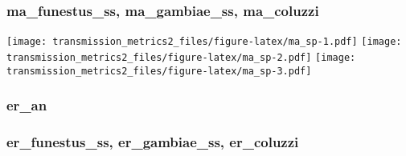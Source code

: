 \documentclass[]{article}
\begin{document}
\hypertarget{ma_funestus_ss-ma_gambiae_ss-ma_coluzzi}{%
\subsubsection{ma\_funestus\_ss, ma\_gambiae\_ss,
ma\_coluzzi}\label{ma_funestus_ss-ma_gambiae_ss-ma_coluzzi}}

\texttt{[image: transmission\_metrics2\_files/figure-latex/ma\_sp-1.pdf]}
\texttt{[image: transmission\_metrics2\_files/figure-latex/ma\_sp-2.pdf]}
\texttt{[image: transmission\_metrics2\_files/figure-latex/ma\_sp-3.pdf]}

\hypertarget{er_an}{%
\subsubsection{er\_an}\label{er_an}}

\hypertarget{er_funestus_ss-er_gambiae_ss-er_coluzzi}{%
\subsubsection{er\_funestus\_ss, er\_gambiae\_ss,
er\_coluzzi}\label{er_funestus_ss-er_gambiae_ss-er_coluzzi}}
\end{document}
